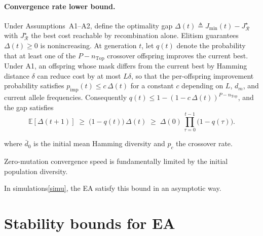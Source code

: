 \documentclass[conference]{IEEEtran}
\newtheorem{assumption}{Assumption}
\begin{document}
\paragraph{Convergence rate lower bound.}

Under Assumptions~A1--A2, define the optimality gap
$\Delta(t)\triangleq J_{\min}(t)-J^\star_{\mathcal{R}}$
with $J^\star_{\mathcal{R}}$ the best cost reachable by recombination alone.
Elitism guarantees $\Delta(t)\!\ge\!0$ is nonincreasing.
At generation $t$, let $q(t)$ denote the probability that at
least one of the $P\!-\!n_{\mathrm{Top}}$ crossover offspring improves
the current best.  Under A1, an offspring whose mask differs from the
current best by Hamming distance $\delta$ can reduce cost by at most
$L\delta$, so that the per-offspring improvement probability satisfies
$p_{\mathrm{imp}}(t)\!\le\! c\,\Delta(t)$ for a constant
$c$ depending on $L$, $d_m$, and current allele frequencies.
Consequently $q(t)\le 1-(1-c\,\Delta(t))^{P-n_{\mathrm{Top}}}$,
and the gap satisfies
\begin{equation}\label{eq:gap_recursion}
  \mathbb{E}[\Delta(t\!+\!1)]
  \;\ge\;\bigl(1-q(t)\bigr)\,\Delta(t)
  \;\ge\;\Delta(0)\,\prod_{\tau=0}^{t-1}\bigl(1-q(\tau)\bigr).
\end{equation}

where $\bar d_0$ is the initial mean Hamming diversity and $p_c$ the
crossover rate.  

Zero-mutation
convergence speed is fundamentally limited by the initial population
diversity.

In simulations\ref{simu}, the EA satisfy this bound in an asymptotic way.

\section{Stability bounds for EA}

\end{document}
